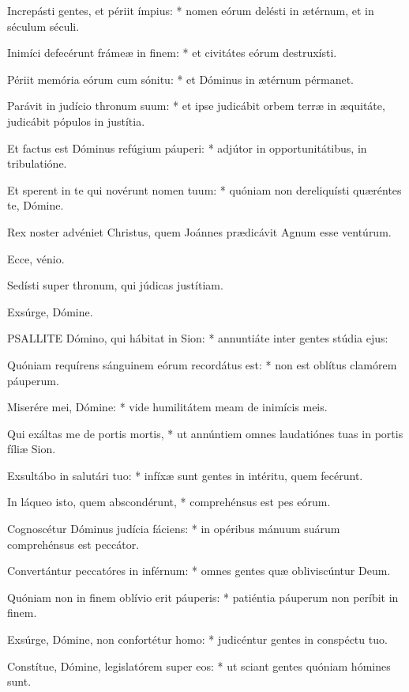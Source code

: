 Increpásti gentes, et périit ímpius: * nomen eórum delésti in ætérnum, et in séculum séculi.

Inimíci defecérunt frámeæ in finem: * et civitátes eórum destruxísti.

Périit memória eórum cum sónitu: * et Dóminus in ætérnum pérmanet.

Parávit in judício thronum suum: * et ipse judicábit orbem terræ in æquitáte, judicábit pópulos in justítia.

Et factus est Dóminus refúgium páuperi: * adjútor in opportunitátibus, in tribulatióne.

Et sperent in te qui novérunt nomen tuum: * quóniam non dereliquísti quæréntes te, Dómine.

  Rex noster advéniet Christus, quem Joánnes prædicávit Agnum esse ventúrum.

 Ecce, vénio.

  Sedísti super thronum, qui júdicas justítiam.

 Exsúrge, Dómine.


\lettrine[lines=2]{P}{SALLITE} Dómino, qui hábitat in Sion: * annuntiáte inter gentes stúdia ejus:

Quóniam requírens sánguinem eórum recordátus est: * non est oblítus clamórem páuperum.

Miserére mei, Dómine: * vide humilitátem meam de inimícis meis.

Qui exáltas me de portis mortis, * ut annúntiem omnes laudatiónes tuas in portis fíliæ Sion.

Exsultábo in salutári tuo: * infíxæ sunt gentes in intéritu, quem fecérunt.

In láqueo isto, quem abscondérunt, * comprehénsus est pes eórum.

Cognoscétur Dóminus judícia fáciens: * in opéribus mánuum suárum comprehénsus est peccátor.

Convertántur peccatóres in inférnum: * omnes gentes quæ obliviscúntur Deum.

Quóniam non in finem oblívio erit páuperis: * patiéntia páuperum non períbit in finem.

Exsúrge, Dómine, non confortétur homo: * judicéntur gentes in conspéctu tuo.

Constítue, Dómine, legislatórem super eos: * ut sciant gentes quóniam hómines sunt.


